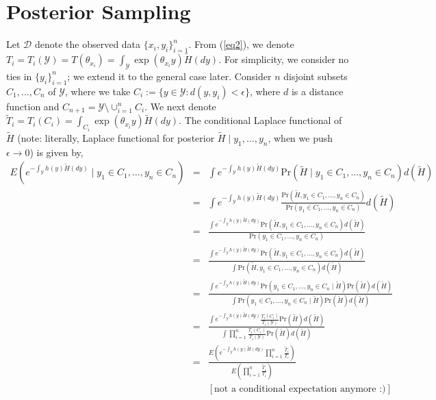 \documentclass[10pt, oneside]{article}   	%
\newcommand{\refa}[1]{\textcolor{blue}{\ref{#1}}}
\renewcommand{\th}{\theta}
\newcommand{\thh}{\widetilde{H}}
\newcommand{\sy}{\mathcal{Y}}
\renewcommand{\sy}{\mathcal{Y}}
\newcommand{\sd}{\mathcal{D}}
\newcommand{\eps}{\epsilon}
\newcommand{\pr}{\mbox{Pr}}
\begin{document}
\section{Posterior Sampling}
\label{sec2}
Let $\sd$ denote the observed data $\{x_i, y_i\}_{i=1}^n$. From (\refa{eq2}), we denote $T_i = T_i(\sy) = T(\th_{x_i}) = \int_{\mathcal{Y}} \exp (\th_{x_i} y) \thh(dy)$. For simplicity, we consider no ties in $\{y_i\}^n_{i=1}$; we extend it to the general case later. Consider $n$ disjoint subsets $C_1, \dots, C_n$ of $\sy$, where we take $C_i := \{y \in \sy: d(y, y_i) < \eps\}$, where $d$ is a distance function and $C_{n+1} = \sy \setminus \cup^n_{i=1} C_i$. We next denote $\widetilde T_i = T_i(C_i) =  \int_{C_i} \exp (\th_{x_i} y) \thh(dy)$. The conditional Laplace functional of $\thh$ (note: literally, Laplace functional for posterior $\thh \mid y_1, \dots, y_n$, when we push $\eps \to 0$) is given by,
\begin{eqnarray*}
E \left(e^{-\int_\sy h(y) \thh(dy)} \mid y_1 \in C_1, \dots, y_n \in C_n\right) & = & \int e^{-\int_\sy h(y) \thh(dy)} \pr(\thh \mid y_1 \in C_1, \dots, y_n \in C_n) d(\thh)\\
& = & \int e^{-\int_\sy h(y) \thh(dy)} \frac{\pr(\thh, y_1 \in C_1, \dots, y_n \in C_n)}{\pr(y_1 \in C_1, \dots, y_n \in C_n)} d(\thh)\\
& = &  \frac{\int e^{-\int_\sy h(y) \thh(dy)} \pr(\thh, y_1 \in C_1, \dots, y_n \in C_n)d(\thh)}{\pr(y_1 \in C_1, \dots, y_n \in C_n)} \\
& = &  \frac{\int e^{-\int_\sy h(y) \thh(dy)} \pr(\thh, y_1 \in C_1, \dots, y_n \in C_n)d(\thh)}{\int \pr(\thh, y_1 \in C_1, \dots, y_n \in C_n) d(\thh)} \\
& = &  \frac{\int e^{-\int_\sy h(y) \thh(dy)} \pr(y_1 \in C_1, \dots, y_n \in C_n \mid \thh) \pr(\thh)d(\thh)}{\int \pr(y_1 \in C_1, \dots, y_n \in C_n \mid \thh) \pr(\thh) d(\thh)} \\
& = &  \frac{\int e^{-\int_\sy h(y) \thh(dy)} \frac{T_i(C_i)}{T_i(\sy)} \pr(\thh) d(\thh)}{\int \prod_{i=1}^n \frac{T_i(C_i)}{T_i(\sy)} \pr(\thh) d(\thh)} \\
& = &  \frac{E\left( e^{-\int_\sy h(y) \thh(dy)} \prod_{i = 1}^n \frac{\widetilde T_i}{T_i} \right)}{E \left(\prod_{i=1}^n \frac{\widetilde T_i}{T_i} \right)} \\
& & [\mbox{not a conditional expectation anymore :)}] \\
\end{eqnarray*}
\end{document}
